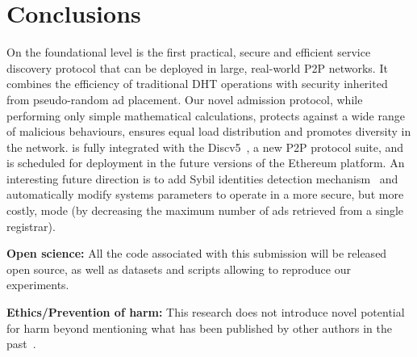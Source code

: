 
\section{Conclusions}
\label{sec:con}
On the foundational level \sysname is the first practical, secure and efficient service discovery protocol that can be deployed in large, real-world P2P networks. It combines the efficiency of traditional DHT operations with security inherited from pseudo-random ad placement. Our novel admission protocol, while performing only simple mathematical calculations, protects against a wide range of malicious behaviours, ensures equal load distribution and promotes diversity in the network.
\sysname is fully integrated with the Discv5~\cite{discv5}, a new P2P protocol suite, and is scheduled for deployment in the future versions of the Ethereum platform. 
An interesting future direction is to add Sybil identities detection mechanism~\cite{cholez2010efficient} and automatically modify systems parameters to operate in a more secure, but more costly, mode (\eg by decreasing the maximum number of ads retrieved from a single registrar). 


{\footnotesize

\smallskip

\noindent
\textbf{Open science:} All the code associated with this submission will be released open source, as well as datasets and scripts allowing to reproduce our experiments.

\smallskip

\footnotesize
\noindent
\textbf{Ethics/Prevention of harm:} This research does not introduce novel potential for harm beyond mentioning what has been published by other authors in the past~\cite{marcus2018low,henningsen2019eclipsing}.
}
